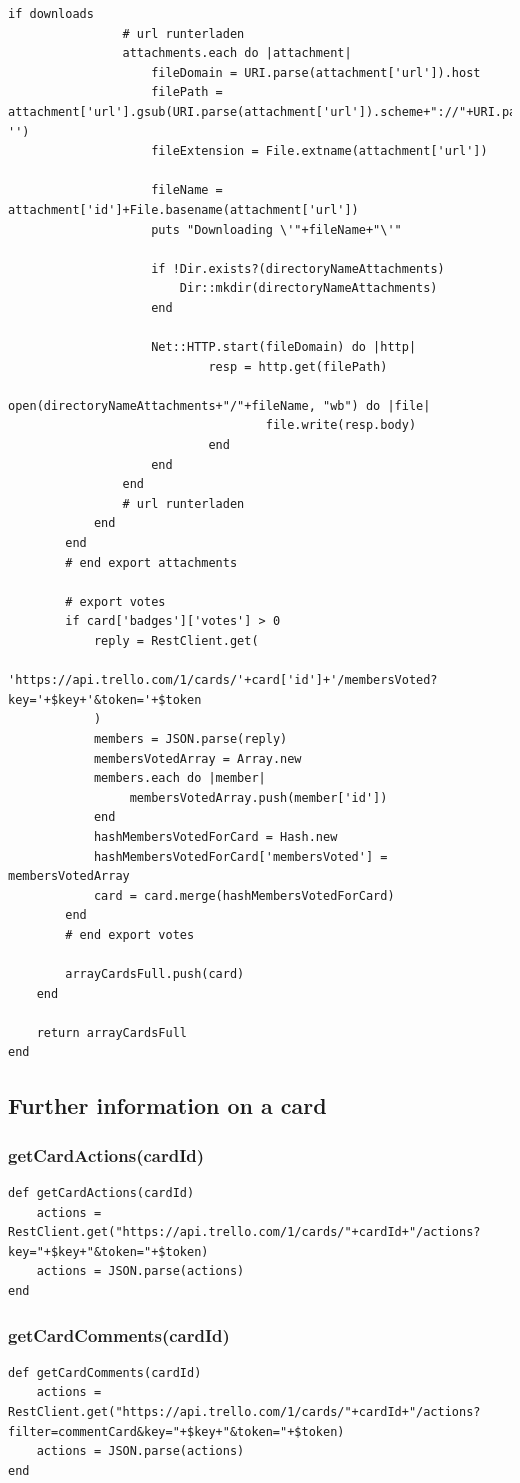 \begin{lstlisting}[aboveskip=1\baselineskip, caption= getCardsAsArray(), label=listing063]
			if downloads
				# url runterladen
				attachments.each do |attachment|
					fileDomain = URI.parse(attachment['url']).host
					filePath = attachment['url'].gsub(URI.parse(attachment['url']).scheme+"://"+URI.parse(attachment['url']).host, '')
					fileExtension = File.extname(attachment['url'])
					
					fileName = attachment['id']+File.basename(attachment['url'])
					puts "Downloading \'"+fileName+"\'"
								
					if !Dir.exists?(directoryNameAttachments)
						Dir::mkdir(directoryNameAttachments)
					end
					
					Net::HTTP.start(fileDomain) do |http|
							resp = http.get(filePath)
							open(directoryNameAttachments+"/"+fileName, "wb") do |file|
									file.write(resp.body)
							end
					end      
				end
				# url runterladen
			end       
		end	
		# end export attachments
		
		# export votes
		if card['badges']['votes'] > 0
			reply = RestClient.get(
					'https://api.trello.com/1/cards/'+card['id']+'/membersVoted?key='+$key+'&token='+$token
			)
			members = JSON.parse(reply)
			membersVotedArray = Array.new
			members.each do |member|
				 membersVotedArray.push(member['id'])
			end
			hashMembersVotedForCard = Hash.new			
			hashMembersVotedForCard['membersVoted'] = membersVotedArray
			card = card.merge(hashMembersVotedForCard)	
		end
		# end export votes
		
		arrayCardsFull.push(card)
	end
	
	return arrayCardsFull
end
\end{lstlisting}

\subsection{Further information on a card}

\subsubsection{getCardActions(cardId)}
\begin{lstlisting}[aboveskip=1\baselineskip, caption=getCardActions(), label=listing051]
def getCardActions(cardId)
	actions = RestClient.get("https://api.trello.com/1/cards/"+cardId+"/actions?key="+$key+"&token="+$token)
	actions = JSON.parse(actions)
end
\end{lstlisting}

\subsubsection{getCardComments(cardId)}
\begin{lstlisting}[aboveskip=1\baselineskip, caption= getCardComments(), label=listing052]
def getCardComments(cardId)
	actions = RestClient.get("https://api.trello.com/1/cards/"+cardId+"/actions?filter=commentCard&key="+$key+"&token="+$token)
	actions = JSON.parse(actions)
end
\end{lstlisting}

